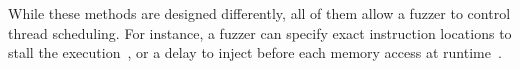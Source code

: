 While these methods are designed differently, all of them allow a
fuzzer to control thread scheduling.
%
For instance, a fuzzer can specify exact instruction locations to
stall the execution~\cite{snowboard, razzer, conzzer}, or a delay to
inject before each memory access at runtime~\cite{krace}.







